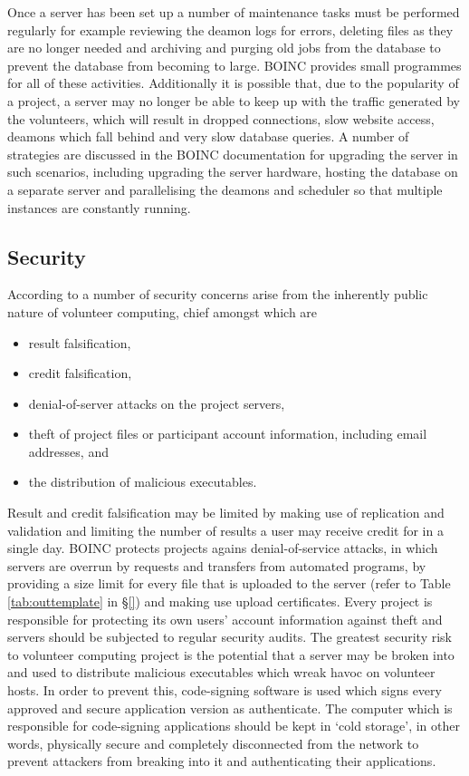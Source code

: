 Once a server has been set up a number of maintenance tasks must be performed regularly for example reviewing the deamon logs for errors, deleting files as they are no longer needed and archiving  and purging old jobs from the database to prevent the database from becoming to large. BOINC provides small programmes for all of these activities. Additionally it is possible that, due to the popularity of a project, a server may no longer be able to keep up with  the traffic generated by the volunteers, which will result in dropped connections, slow website access, deamons which fall behind and very slow database queries. A number of strategies are discussed in the BOINC documentation for upgrading the server in such scenarios, including upgrading the server hardware,  hosting the database on a separate server and  parallelising the deamons and scheduler so that multiple instances are constantly running.

\subsection{Security} \label{Bsecurity}
According to \cite{boincwiki} a number of security concerns arise from the inherently public nature of volunteer computing, chief amongst which are
\begin{itemize}
\item result falsification,
\item credit falsification,
\item denial-of-server attacks on the project servers, 
\item theft of project files or participant account information, including email addresses, and
\item the distribution of malicious executables.
\end{itemize}
Result and credit falsification may be limited by making use of replication and validation and limiting the number of results a user may receive credit for in a single day. 
BOINC protects projects agains denial-of-service attacks, in which servers are overrun by requests and transfers from automated programs, by providing a size limit for every file that is uploaded to the server (refer to Table \ref{tab:outtemplate} in \S \ref{}) and making use upload certificates. Every project is responsible for protecting its own users' account information against theft and servers should be subjected to regular security audits.  
The greatest security risk to volunteer computing project is the potential that a server may be broken into and used to distribute malicious executables which wreak havoc on  volunteer hosts. In order to prevent this, code-signing software is used which signs every approved and secure application version as authenticate. The computer which is responsible for code-signing applications should be kept in `cold storage', in other words, physically secure and completely disconnected from the network to prevent attackers from breaking into it and authenticating their applications. 

